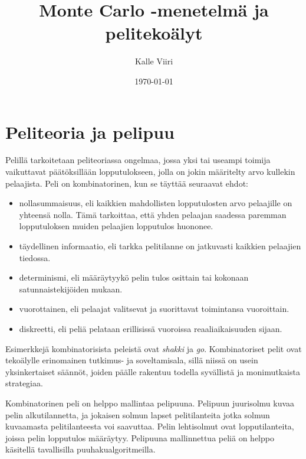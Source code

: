 \documentclass[12pt,finnish]{tktltiki2}
\title{Monte Carlo -menetelmä ja pelitekoälyt}
\author{Kalle Viiri}
\date{\today}
\theoremstyle{definition}
\theoremstyle{remark}
\begin{document}

\frontmatter      %

\maketitle        %
\makeabstract     %

\tableofcontents  %


\mainmatter       %

\section{Peliteoria ja pelipuu}

Pelillä tarkoitetaan peliteoriassa ongelmaa, jossa yksi tai useampi toimija vaikuttavat päätöksillään lopputulokseen, jolla on jokin määritelty arvo kullekin pelaajista. Peli on kombinatorinen, kun se täyttää seuraavat ehdot:~\cite{browne}

\begin{itemize}
	\item nollasummaisuus, eli kaikkien mahdollisten lopputulosten arvo pelaajille on yhteensä nolla. Tämä tarkoittaa, että yhden pelaajan saadessa paremman lopputuloksen muiden pelaajien lopputulos huononee.
	 \item täydellinen informaatio, eli tarkka pelitilanne on jatkuvasti kaikkien pelaajien tiedossa.
	 \item determinismi, eli määräytyykö pelin tulos osittain tai kokonaan satunnaistekijöiden mukaan.
	 \item vuorottainen, eli pelaajat valitsevat ja suorittavat toimintansa vuoroittain.
	 \item diskreetti, eli peliä pelataan erillisissä vuoroissa reaaliaikaisuuden sijaan.
\end{itemize}

Esimerkkejä kombinatorisista peleistä ovat \textit{shakki} ja \textit{go}. Kombinatoriset pelit ovat tekoälylle erinomainen tutkimus- ja soveltamisala, sillä niissä on usein yksinkertaiset säännöt, joiden päälle rakentuu todella syvällistä ja monimutkaista strategiaa.~\cite{browne}

Kombinatorinen peli on helppo mallintaa pelipuuna. Pelipuun juurisolmu kuvaa pelin alkutilannetta, ja jokaisen solmun lapset pelitilanteita jotka solmun kuvaamasta pelitilanteesta voi saavuttaa. Pelin lehtisolmut ovat lopputilanteita, joissa pelin lopputulos määräytyy. Pelipuuna mallinnettua peliä on helppo käsitellä tavallisilla puuhakualgoritmeilla.~\cite{aima}
\end{document}
